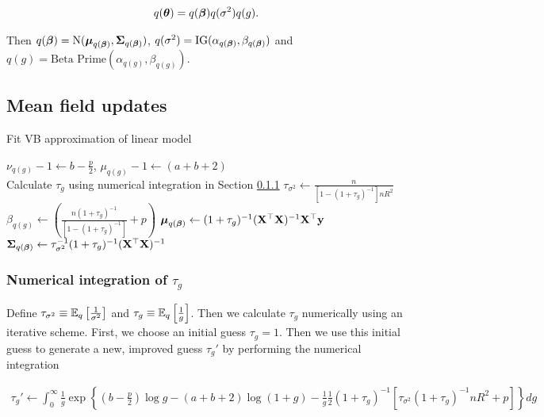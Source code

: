 \documentclass{amsart}[12pt]
\begin{document}
\begin{align*}
q({\boldsymbol \theta}) = q({\boldsymbol \beta}) q(\sigma^2) q(g).
\end{align*}

Then $q({\boldsymbol \beta}) = \text{N}({\boldsymbol \mu}_{q({\boldsymbol \beta})}, {\boldsymbol \Sigma}_{q({\boldsymbol \beta})})$, $q(\sigma^2) = \text{IG}(\alpha_{q({\boldsymbol \beta})}, \beta_{q({\boldsymbol \beta})})$ and $q(g) = \text{Beta Prime}(\alpha_{q(g)}, \beta_{q(g)})$.

\subsection{Mean field updates}

\begin{algorithm}
\label{alg:algorithm_one}
\caption{Fit VB approximation of linear model}
\begin{algorithmic}
\REQUIRE $\nu_{q(g)} - 1 \leftarrow b - \frac{p}{2}$, $\mu_{q(g)} - 1 \leftarrow (a + b + 2)$ \\
\STATE Calculate $\tau_{g}$ using numerical integration in Section \ref{sec:num_int}
\ENDWHILE
\STATE $\tau_{\sigma^2} \leftarrow \frac{n}{[1 - (1 + \tau_g)^{-1}] n R^2}$
\STATE $\beta_{q(g)} \leftarrow \left(\frac{n (1 + \tau_g)^{-1}}{[1 - (1 + \tau_g)^{-1}]} + p \right)$
\STATE ${\boldsymbol \mu}_{q({\boldsymbol \beta})} \leftarrow (1 + \tau_g)^{-1} ({\bf X}^\top {\bf X})^{-1} {\bf X}^\top {\bf y}$
\STATE ${\boldsymbol \Sigma}_{q({\boldsymbol \beta})} \leftarrow \tau_{\sigma^2}^{-1} (1 + \tau_{g})^{-1}({\bf X}^\top {\bf X})^{-1}$
\end{algorithmic}
\end{algorithm}

\subsubsection{Numerical integration of $\tau_g$}\label{sec:num_int}

Define $\tau_{\sigma^2} \equiv \mathbb{E}_q \left[ \frac{1}{\sigma^2} \right]$ and
$\tau_g \equiv \mathbb{E}_q \left[ \frac{1}{g} \right]$. Then we calculate $\tau_g$ numerically using an iterative 
scheme. First, we choose an initial guess $\tau_g = 1$. Then we use this initial guess to generate a new,
improved guess $\tau_g'$ by performing the numerical integration

\begin{align*}
\tau_g' \leftarrow \int_0^\infty \frac{1}{g} \exp \left \{ \left(b - \frac{p}{2}\right) \log g
- (a + b + 2) \log(1 + g)
- \frac{1}{g} \frac{1}{2} (1 + \tau_g)^{-1} [\tau_{\sigma^2} (1 + \tau_g)^{-1} n R^2 + p]
	  \right \} dg
\end{align*}
\end{document}
